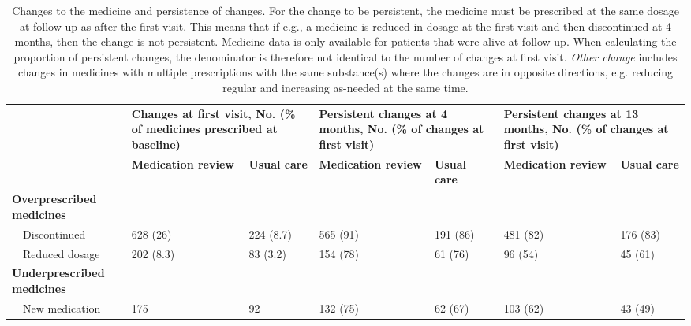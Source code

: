 \begin{table}[!h]
\label{tbl:tbl1}
\caption{Changes to the medicine and persistence of changes. For the change to be persistent, the medicine must be prescribed at the same dosage at follow-up as after the first visit. This means that if e.g., a medicine is reduced in dosage at the first visit and then discontinued at 4 months, then the change is not persistent. Medicine data is only available for patients that were alive at follow-up. When calculating the proportion of persistent changes, the denominator is therefore not identical to the number of changes at first visit. \textit{Other change} includes changes in medicines with multiple prescriptions with the same substance(s) where the changes are in opposite directions, e.g. reducing regular and increasing as-needed at the same time.}
\centering
\begin{tabular}{p{3cm}
                p{1.5cm}
                p{1.5cm}
                p{1.5cm}
                p{1.5cm}
                p{1.5cm}
                p{1.5cm}
}
\toprule
\multirow{2}{*}{} &
  \multicolumn{2}{p{3cm}}{\textbf{Changes at first visit, No. (\% of medicines prescribed at baseline)}} &
  \multicolumn{2}{p{4cm}}{\textbf{Persistent changes at 4   months, No. (\% of changes at first visit)}} &
  \multicolumn{2}{p{4cm}}{\textbf{Persistent changes at 13   months, No. (\% of changes at first visit)}} \\ \cmidrule(l){2-7} 
                                   & \textbf{Medication review} & \textbf{Usual care} & \textbf{Medication review} & \textbf{Usual care} & \textbf{Medication review} & \textbf{Usual care} \\ \cmidrule(r){1-1}
\textbf{Overprescribed medicines}  &                   &            &                   &            &                   &            \\
~~Discontinued                     & 628 (26)          & 224 (8.7)  & 565 (91)          & 191 (86)   & 481 (82)          & 176 (83)   \\
~~Reduced dosage                   & 202 (8.3)         & 83 (3.2)   & 154 (78)          & 61 (76)    & 96 (54)           & 45 (61)    \\
\textbf{Underprescribed medicines} &                   &            &                   &            &                   &            \\
~~New medication                   & 175               & 92         & 132 (75)          & 62 (67)    & 103 (62)          & 43 (49)    \\

\end{tabular}
\end{table}
